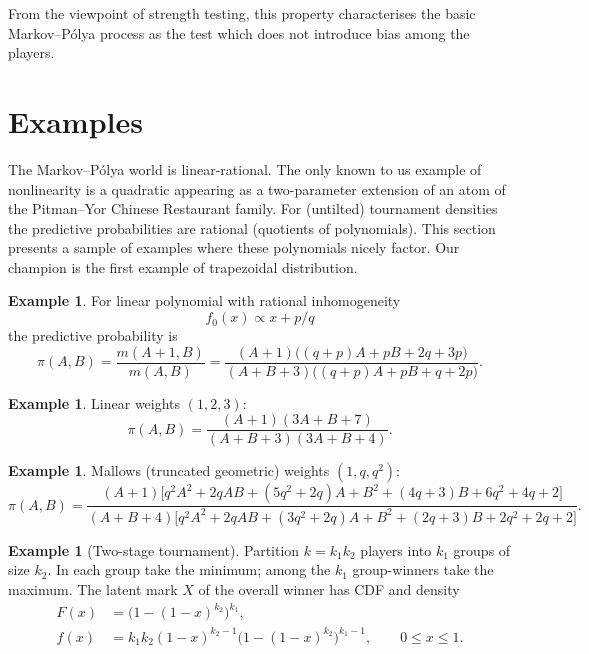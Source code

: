 \documentclass[11pt,reqno]{amsart}
\theoremstyle{definition}
\newtheorem{example}[theorem]{Example}
\theoremstyle{remark}
\numberwithin{equation}{section}
\begin{document}
From the viewpoint of strength testing, this property characterises the basic Markov--P\'olya process as the test which does not introduce bias among the players.

\section{Examples}

The Markov--P\'olya world is linear-rational. The only known to us example of nonlinearity is a quadratic \cite{Gnedin2010species} appearing as a two-parameter extension of an atom of the Pitman--Yor Chinese Restaurant family. For (untilted) tournament densities the predictive probabilities are rational (quotients of polynomials). This section presents a sample of examples where these polynomials nicely factor. Our champion is the first example of trapezoidal distribution.

\begin{example}
For linear polynomial with rational inhomogeneity
\[
f_0(x)\propto x+p/q
\]
the predictive probability is
\[
\pi(A,B)=\frac{m(A+1,B)}{m(A,B)}=\frac{(A+1)\bigl((q+p)A+pB+2q+3p\bigr)}{(A+B+3)\bigl((q+p)A+pB+q+2p\bigr)}.
\]
\end{example}

\begin{example}
Linear weights \((1,2,3)\):
\begin{equation}\label{eq:123}
\pi(A,B)=\frac{(A+1)(3A+B+7)}{(A+B+3)(3A+B+4)}.
\end{equation}
\end{example}

\begin{example}
Mallows (truncated geometric) weights \((1,q,q^2)\):
\begin{equation}\label{eq:Mallows}
\pi(A,B)=\frac{(A+1)\bigl[q^2A^2+2qAB+(5q^2+2q)A+B^2+(4q+3)B+6q^2+4q+2\bigr]}{(A+B+4)\bigl[q^2A^2+2qAB+(3q^2+2q)A+B^2+(2q+3)B+2q^2+2q+2\bigr]}.
\end{equation}
\end{example}

\begin{example}[Two-stage tournament]
Partition \(k=k_1k_2\) players into \(k_1\) groups of size \(k_2\). In each group take the minimum; among the \(k_1\) group-winners take the maximum. The latent mark \(X\) of the overall winner has CDF and density
\begin{align*}
F(x)&=\bigl(1-(1-x)^{k_2}\bigr)^{k_1},\\
f(x)&=k_1k_2(1-x)^{k_2-1}\bigl(1-(1-x)^{k_2}\bigr)^{k_1-1},\qquad0\le x\le1.
\end{align*}
\end{example}
\end{document}
